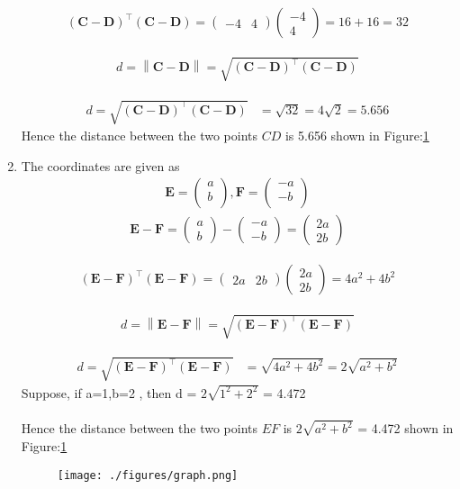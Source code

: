 \documentclass[12pt]{article}
\providecommand{\brak}[1]{\ensuremath{\left(#1\right)}}
\providecommand{\norm}[1]{\left\lVert#1\right\rVert}
\newcommand{\myvec}[1]{\ensuremath{\begin{pmatrix}#1\end{pmatrix}}}
\let\vec\mathbf
\begin{document}
\begin{enumerate}
	
	
	\begin{align}
		(\vec{C}-\vec{D})^\top (\vec{C}-\vec{D}) = \myvec{-4&4} \myvec{-4\\4} = 16+16 = 32
	\end{align}
	
	\begin{align}
		d=\norm{\vec{C}-\vec{D}}=\sqrt{\brak{\vec{C} -\vec{D}}^{\top}\brak{\vec{C} -\vec{D}}}
	\end{align}

\begin{align}
d=\sqrt{\brak{\vec{C} -\vec{D}}^{\top}\brak{\vec{C} -\vec{D}}}
 &=\sqrt{32}=4\sqrt{2}=5.656
\end{align}	
	Hence the distance between the two points $CD$ is 5.656 shown in Figure:\ref{fig:Fig}
	

	
\item The coordinates are given as
	\begin{align}
	\vec{E} = \myvec{
		a\\
		b\\
		},
	\vec{F} = \myvec{
		-a\\
		-b\\
		}
	\end{align}
	\begin{align}
		\vec{E} - \vec{F} = \myvec{a\\b} - \myvec{-a\\-b} = \myvec{2a\\2b}		
	\end{align}
	
	
	
	\begin{align}
		(\vec{E}-\vec{F})^\top (\vec{E}-\vec{F}) = \myvec{2a&2b} \myvec{2a\\2b} = 4a^2+4b^2 
	\end{align}
	
	\begin{align}
		d=\norm{\vec{E}-\vec{F}}=\sqrt{\brak{\vec{E} -\vec{F}}^{\top}\brak{\vec{E} -\vec{F}}}
	\end{align}

\begin{align}
d=\sqrt{\brak{\vec{E} -\vec{F}}^{\top}\brak{\vec{E} -\vec{F}}}
 &=\sqrt{4a^2+4b^2 }=2\sqrt{a^2+b^2}
\end{align}	
 Suppose, if a=1,b=2 , then d = $2\sqrt{1^2+2^2}$ = 4.472\\
	\\Hence the distance between the two points $EF$ is $2\sqrt{a^2+b^2}$ = 4.472 shown in Figure:\ref{fig:Fig}

\begin{figure}[!h]
	\begin{center} 
	    \texttt{[image: ./figures/graph.png]}
	\end{center}
\caption{}
\label{fig:Fig}
\end{figure}
\end{enumerate}
\end{document}
